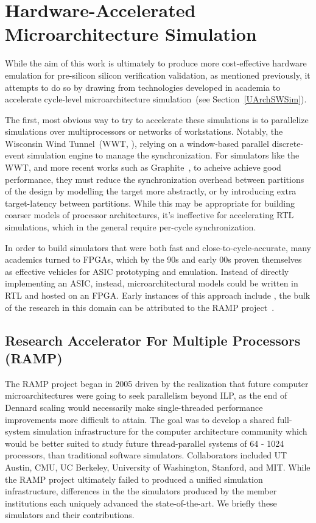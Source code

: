 \section{Hardware-Accelerated Microarchitecture Simulation}

While the aim of this work is ultimately to produce more cost-effective hardware emulation for 
pre-silicon silicon verification validation, as mentioned previously, it attempts to do so by drawing
from technologies developed in academia to accelerate cycle-level microarchitecture simulation~(see Section~\ref{UArchSWSim}).

The first, most obvious way to try to accelerate these simulations is to
parallelize simulations over multiprocessors or networks of workstations.
Notably, the Wisconsin Wind Tunnel~(WWT, \cite{WisconsinWindTunnel}), relying
on a window-based parallel discrete-event simulation engine to manage the
synchronization. For simulators like the WWT, and more recent works such as Graphite~\cite{Graphite}, to acheive achieve
good performance, they must reduce the synchronization overhead between
partitions of the design by modelling the target more abstractly, or by
introducing extra target-latency between partitions.  While this may be
appropriate for building coarser models of processor architectures, it's
ineffective for accelerating RTL simulations, which in the general require
per-cycle synchronization.

In order to build simulators that were both fast and close-to-cycle-accurate,
many academics turned to FPGAs, which by the 90s and early 00s proven themselves as effective
vehicles for ASIC prototyping and emulation. Instead of directly implementing an
ASIC, instead, microarchitectural models could be written in RTL and
hosted on an FPGA. Early instances of this approach include , the bulk 
of the research in this domain can be attributed to the RAMP project~\cite{RAMP}.

\subsection{Research Accelerator For Multiple Processors (RAMP)}

The RAMP project began in 2005 driven by the realization that future computer
microarchitectures were going to seek parallelism beyond ILP, as the end of
Dennard scaling would necessarily make single-threaded performance improvements
more difficult to attain. The goal was to develop a shared full-system
simulation infrastructure for the computer architecture community which would
be better suited to study future thread-parallel systems of 64 - 1024
processors, than traditional software simulators. Collaborators included UT
Austin, CMU, UC Berkeley, University of Washington, Stanford, and MIT.  While
the RAMP project ultimately failed to produced a unified simulation
infrastructure, differences in the the simulators produced by the member
institutions each uniquely advanced the state-of-the-art. We briefly these
simulators and their contributions.

